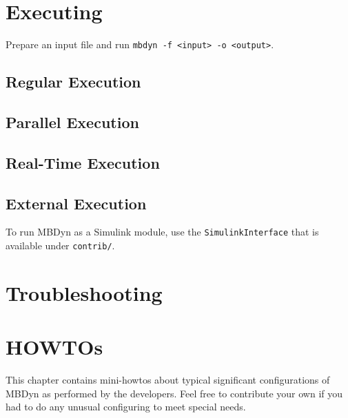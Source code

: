 \documentclass[10pt,dvips]{report}
\newcommand{\kw}[1]{\texttt{#1}}
\begin{document}
\chapter{Executing}
Prepare an input file and run \kw{mbdyn -f <input> -o <output>}.

\section{Regular Execution}

\section{Parallel Execution}

\section{Real-Time Execution}

\section{External Execution}
To run MBDyn as a Simulink module, use the \kw{SimulinkInterface}
that is available under \kw{contrib/}.

\chapter{Troubleshooting}

\chapter{HOWTOs}
This chapter contains mini-howtos about typical significant
configurations of MBDyn as performed by the developers.
Feel free to contribute your own if you had to do any unusual
configuring to meet special needs.
\end{document}
